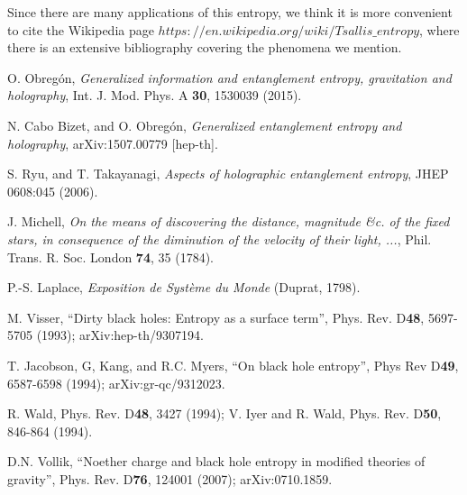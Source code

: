 \documentclass[nofootinbib,aps,prd,preprint,groupedaddress,showpacs,showkeys]{revtex4-1}
\begin{document}
\begin{thebibliography}{99}
 Since there are many applications of this entropy, we think it is more convenient to cite the Wikipedia page $https://en.wikipedia.org/wiki/Tsallis\_entropy$, where there is an extensive bibliography covering the phenomena we mention.

 O. Obreg\'on, {\it Generalized information and entanglement entropy, gravitation and holography}, Int. J. Mod. Phys. A {\bf 30}, 1530039 (2015).

 N. Cabo Bizet, and O. Obreg\'on, {\it Generalized entanglement entropy and holography}, arXiv:1507.00779 [hep-th].

 S. Ryu, and T. Takayanagi, \textit{Aspects of holographic entanglement entropy}, JHEP 0608:045 (2006).

 J. Michell, \textit{On the means of discovering the distance, magnitude \&c. of the fixed stars, in consequence of the diminution of the velocity of their light, ...}, Phil. Trans. R. Soc. London \textbf{74}, 35 (1784).

 P.-S. Laplace, \textit{Exposition de Syst\`eme du Monde} (Duprat, 1798).

 M. Visser, ``Dirty black holes: Entropy as a surface term'', Phys. Rev. D\textbf{48}, 5697-5705 (1993); arXiv:hep-th/9307194.

 T. Jacobson, G, Kang, and R.C. Myers, ``On black hole entropy'', Phys Rev D\textbf{49}, 6587-6598 (1994); arXiv:gr-qc/9312023.

 R. Wald, Phys. Rev. D\textbf{48}, 3427 (1994); V. Iyer and R. Wald, Phys. Rev. D\textbf{50}, 846-864 (1994).

 D.N. Vollik, ``Noether charge and black hole entropy in modified theories of gravity'', Phys. Rev. D\textbf{76}, 124001 (2007); arXiv:0710.1859.

\end{thebibliography}
\end{document}
